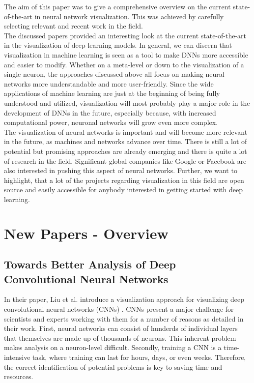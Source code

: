 \documentclass{acmsiggraph}               %
\begin{document}
The aim of this paper was to give a comprehensive overview on the current state-of-the-art in neural network visualization. This was achieved by carefully selecting relevant and recent work in the field.\\

The discussed papers provided an interesting look at the current state-of-the-art in the visualization of deep learning models. In general, we can discern that visualization in machine learning is seen as a tool to make DNNs more accessible and easier to modify. Whether on a meta-level or down to the visualization of a single neuron, the approaches discussed above all focus on making neural networks more understandable and more user-friendly. Since the wide applications of machine learning are just at the beginning of being fully understood and utilized, visualization will most probably play a major role in the development of DNNs in the future, especially because, with increased computational power, neuronal networks will grow even more complex.\\

The visualization of neural networks is important and will become more relevant in the future, as machines and networks advance over time. There is still a lot of potential but promising approaches are already emerging and there is quite a lot of research in the field. Significant global companies like Google or Facebook are also interested in pushing this aspect of neural networks. Further, we want to highlight, that a lot of the projects regarding visualization in this field are open source and easily accessible for anybody interested in getting started with deep learning. 

\newpage

\section{New Papers - Overview}
\subsection{Towards Better Analysis of Deep Convolutional Neural Networks}
In their paper, Liu et al. introduce a  visualization approach for visualizing deep convolutional neural networks (CNNs) \cite{Liu2016}. CNNs present a major challenge for scientists and experts working with them for a number of reasons as detailed in their work. First, neural networks can consist of hunderds of individual layers that themselves are made up of thousands of neurons. This inherent problem makes analysis on a neuron-level difficult. Secondly, training a CNN is a time-intensive task, where training can last for hours, days, or even weeks. Therefore, the correct identification of potential problems is key to saving time and resources.\\
\end{document}

